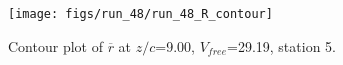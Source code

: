 \begin{figure}[H]
\centering
\texttt{[image: figs/run\_48/run\_48\_R\_contour]}
\caption{Contour plot of $\overline{r}$ at $z/c$=9.00, $V_{free}$=29.19, station 5.}
\end{figure}


